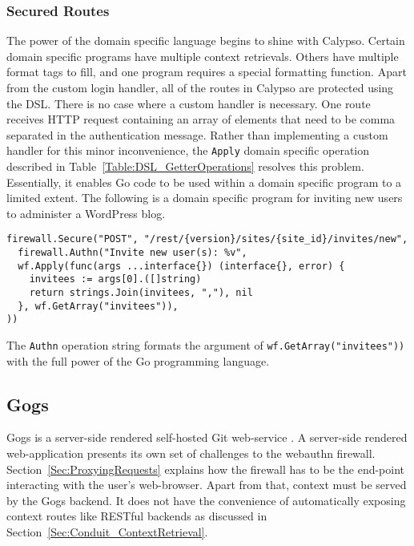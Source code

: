 \subsubsection{Secured Routes}\label{Sec:CalypsoSecuredRoutes}

The power of the domain specific language begins to shine with Calypso. Certain domain specific programs have multiple context retrievals. Others have multiple format tags to fill, and one program requires a special formatting function. Apart from the custom login handler, all of the routes in Calypso are protected using the DSL. There is no case where a custom handler is necessary. One route receives HTTP request containing an array of elements that need to be comma separated in the authentication message. Rather than implementing a custom handler for this minor inconvenience, the \lstinline{Apply} domain specific operation described in Table~\ref{Table:DSL_GetterOperations} resolves this problem. Essentially, it enables Go code to be used within a domain specific program to a limited extent. The following is a domain specific program for inviting new users to administer a WordPress blog.

\begin{lstlisting}
firewall.Secure("POST", "/rest/{version}/sites/{site_id}/invites/new", 
  firewall.Authn("Invite new user(s): %v",
  wf.Apply(func(args ...interface{}) (interface{}, error) {
    invitees := args[0].([]string)
    return strings.Join(invitees, ","), nil
  }, wf.GetArray("invitees")),
))
\end{lstlisting}

The \lstinline{Authn} operation string formats the argument of \lstinline{wf.GetArray("invitees"))} with the full power of the Go programming language.

\subsection{Gogs}

Gogs is a server-side rendered self-hosted Git web-service \cite{TODO-gogs}. A server-side rendered web-application presents its own set of challenges to the webauthn firewall. Section~\ref{Sec:ProxyingRequests} explains how the firewall has to be the end-point interacting with the user's web-browser. Apart from that, context must be served by the Gogs backend. It does not have the convenience of automatically exposing context routes like RESTful backends as discussed in Section~\ref{Sec:Conduit_ContextRetrieval}.

